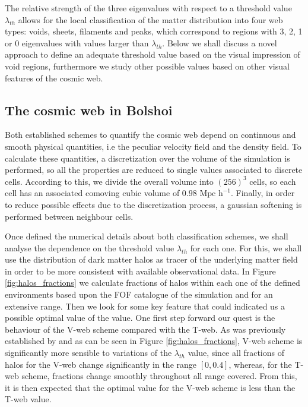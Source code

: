 \documentclass[a4,useAMS,usenatbib,usegraphicx]{latex/mn2e}
\begin{document}
The relative strength of the three eigenvalues with respect to a threshold
value $\lambda_{th}$ allows for the local classification of the matter 
distribution into four web types: voids, sheets, filaments and peaks, 
which correspond to regions with 3, 2, 1 or 0 eigenvalues with values 
larger than $\lambda_{th}$. Below we shall discuss a novel approach to 
define an adequate threshold value based on the visual impression of void
regions, furthermore we study other possible values based on other visual
features of the cosmic web.



\subsection{The cosmic web in Bolshoi}
\label{subsec:web_in_simulations}



Both established schemes to quantify the cosmic web depend on continuous 
and smooth physical quantities, i.e the peculiar velocity field and the 
density field. To calculate these quantities, a discretization over the 
volume of the simulation is performed, so all the properties are reduced 
to single values associated to discrete cells. According to this, we 
divide the overall volume into $(256)^3$ cells, so each cell has an 
associated comoving cubic volume of $0.98 \mbox{ Mpc h}^{-1}$. Finally, in 
order to reduce possible effects due to the discretization process, a 
gaussian softening is performed between neighbour cells.



Once defined the numerical details about both classification schemes, we
shall analyse the dependence on the threshold value $\lambda_{th}$ for 
each one. For this, we shall use the distribution of dark matter halos as 
tracer of the underlying matter field in order to be more consistent with
available observational data. In Figure \ref{fig:halos_fractions} we 
calculate fractions of halos within each one of the defined environments 
based upon the FOF catalogue of the simulation and for an extensive \lth 
range. Then we look for some key feature that could indicated us a 
possible optimal value of the \lth value. One first step forward our quest 
is the behaviour of the V-web scheme compared with the T-web. As was 
previously established by  and as can be seen 
in Figure \ref{fig:halos_fractions}, V-web scheme is significantly more 
sensible to variations of the $\lambda_{th}$ value, since all fractions of
halos for the V-web change significantly in the range $[0,0.4]$, whereas, 
for the T-web scheme, fractions change smoothly throughout all \lth range 
covered. From this, it is then expected that the optimal \lth value for the 
V-web scheme is less than the T-web value.
\end{document}
